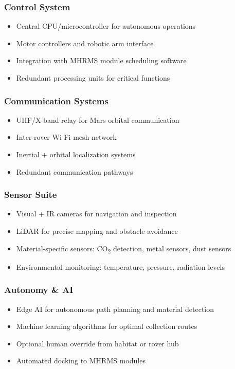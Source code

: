 \documentclass[12pt, a4paper]{article}
\begin{document}
\subsubsection{Control System}
\begin{itemize}
    \item Central CPU/microcontroller for autonomous operations
    \item Motor controllers and robotic arm interface
    \item Integration with MHRMS module scheduling software
    \item Redundant processing units for critical functions
\end{itemize}

\subsubsection{Communication Systems}
\begin{itemize}
    \item UHF/X-band relay for Mars orbital communication
    \item Inter-rover Wi-Fi mesh network
    \item Inertial + orbital localization systems
    \item Redundant communication pathways
\end{itemize}

\subsubsection{Sensor Suite}
\begin{itemize}
    \item Visual + IR cameras for navigation and inspection
    \item LiDAR for precise mapping and obstacle avoidance
    \item Material-specific sensors: CO\textsubscript{2} detection, metal sensors, dust sensors
    \item Environmental monitoring: temperature, pressure, radiation levels
\end{itemize}

\subsubsection{Autonomy \& AI}
\begin{itemize}
    \item Edge AI for autonomous path planning and material detection
    \item Machine learning algorithms for optimal collection routes
    \item Optional human override from habitat or rover hub
    \item Automated docking to MHRMS modules
\end{itemize}
\end{document}
